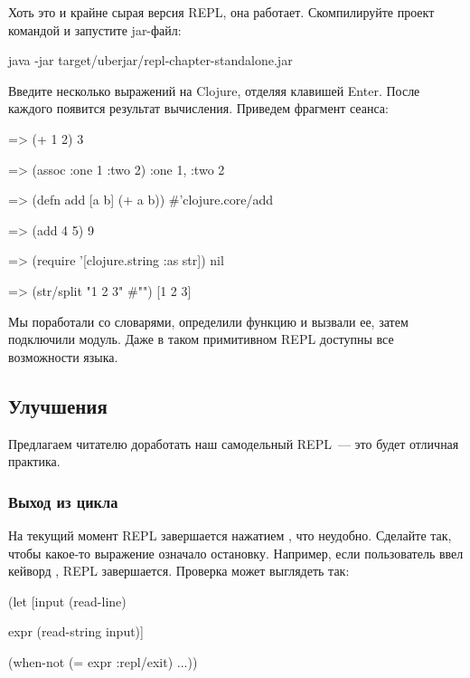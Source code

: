 Хоть это и крайне сырая версия REPL, она работает. Скомпилируйте проект командой  и запустите jar-файл:

\begin{english}
  \begin{clojure}
java -jar target/uberjar/repl-chapter-standalone.jar
  \end{clojure}
\end{english}

Введите несколько выражений на Clojure, отделяя клавишей Enter. После каждого появится результат вычисления. Приведем фрагмент сеанса:

\begin{english}
  \begin{clojure}
=> (+ 1 2)
3

=> (assoc {:one 1} :two 2)
{:one 1, :two 2}

=> (defn add [a b] (+ a b))
#'clojure.core/add

=> (add 4 5)
9

=> (require '[clojure.string :as str])
nil

=> (str/split "1 2 3" #"\s")
[1 2 3]
  \end{clojure}
\end{english}

Мы поработали со словарями, определили функцию и вызвали ее, затем подключили модуль. Даже в таком примитивном REPL доступны все возможности языка.

\subsection{Улучшения}

Предлагаем читателю доработать наш самодельный REPL~--- это будет отличная практика.

\subsubsection{Выход из цикла}

На текущий момент REPL завершается нажатием , что неудобно. Сделайте так, чтобы какое-то выражение означало остановку. Например, если пользователь ввел кейворд , REPL завершается. Проверка может выглядеть так:

\begin{english}
  \begin{clojure}
(let [input
      (read-line)

      expr
      (read-string input)]

  (when-not (= expr :repl/exit)
    ...))
  \end{clojure}
\end{english}

